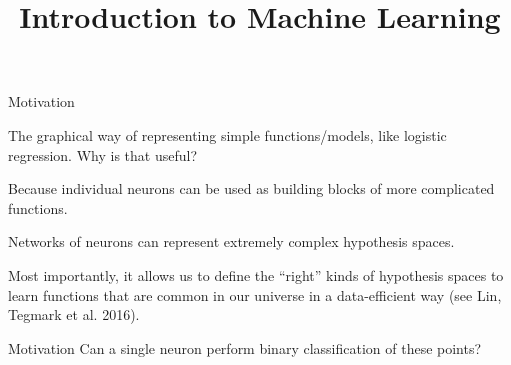 \documentclass[11pt,compress,t,notes=noshow, xcolor=table]{beamer}
\title{Introduction to Machine Learning}
\begin{document}



\begin{framei}{Motivation}
\item The graphical way of representing simple functions/models, like logistic regression. Why is that useful?
\item Because individual neurons can be used as building blocks of more complicated functions.
\item Networks of neurons can represent extremely complex hypothesis spaces.
\item Most importantly, it allows us to define the \enquote{right} kinds of hypothesis spaces to learn functions that are %
common in our universe in a data-efficient way (see Lin, Tegmark et al. 2016).
\end{framei}


\begin{frame}{Motivation}
Can a single neuron perform binary classification of these points?
\begin{figure}
\centering
{}
\end{figure}
\end{frame}
\end{document}
